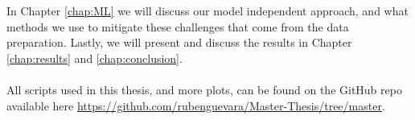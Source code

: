 \documentclass[12pt, a4paper]{book}
\begin{document}
In Chapter \ref{chap:ML} we will discuss our model independent approach, and what methods we use to mitigate these challenges that come from the data preparation. Lastly, we will present and discuss the results in Chapter \ref{chap:results} 
and \ref{chap:conclusion}.\\
\\All scripts used in this thesis, and more plots, can be found on the GitHub repo available here \href{https://github.com/rubenguevara/Master-Thesis/tree/master}{https://github.com/rubenguevara/Master-Thesis/tree/master}.
\end{document}
